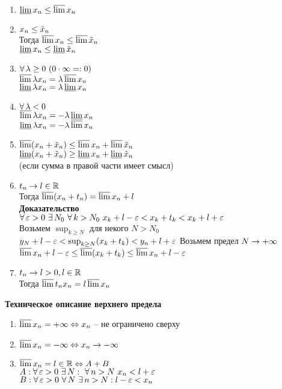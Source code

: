 \documentclass[12pt]{article}
\begin{document}
\begin{enumerate}
    \item $\dlim x_n \leq \ulim x_n$
    \item $x_n \leq \ot x_n$\\
    Тогда $\ulim x_n \leq \ulim \ot x_n$\\
    $\dlim x_n \leq \dlim \ot x_n$
    \item $\fall \lambda \geq 0\ (0\cdot \infty =: 0)$\\
    $\ulim \lambda x_n = \lambda \ulim x_n$\\
    $\dlim \lambda x_n = \lambda \dlim x_n$
    \item $\fall \lambda < 0 $\\
    $\ulim \lambda x_n = -\lambda \dlim x_n$\\
    $\dlim \lambda x_n = -\lambda \ulim x_n$
    \item $\ulim (x_n + \ot x_n) \leq \ulim x_n + \ulim \ot x_n$\\
    $\dlim (x_n + \ot x_n) \geq \dlim x_n + \dlim \ot x_n$\\
    (если сумма в правой части имеет смысл)
    \item $t_n \rto l \in \Rset$\\
    Тогда $\ulim (x_n + t_n) = \ulim x_n + l$\\
    \textbf{Доказательство}\\
    $\fall \eps > 0\ \ex N_0\ \fall k > N_0\ x_k + l - \eps < x_k + t_k < x_k + l + \eps$\\
    Возьмем $\sup_{k \geq N}$ для некого $N > N_0$\\
    $y_N + l - \eps < \sup_{k \geq N} (x_k + t_k) < y_n + l + \eps$
    Возьмем предел $N \rto +\infty$\\
    $\ulim x_n + l - \eps \leq \ulim (x_k + t_k) \leq \ulim x_n + l - \eps$
    \item $t_n \rto l>0, l \in \Rset$\\
    Тогда $\ulim t_nx_n = l\ulim x_n$
\end{enumerate}
\textbf{Техническое описание верхнего предела}
\begin{enumerate}
    \item $\ulim x_n = +\infty \LRto x_n$ -- не ограничено сверху
    \item $\ulim x_n = -\infty \LRto x_n \rto -\infty$
    \item $\ulim x_n = l \in \Rset \LRto A + B$\\
    $A: \fall \eps > 0\ \ex N:\ \fall n > N\ x_n < l + \eps$\\
    $B: \fall \eps > 0\ \fall N\ \ex n > N: l-\eps < x_n$
\end{enumerate}
\end{document}
